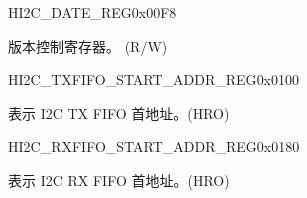     \begin{register}{H}{I2C\_DATE\_REG}{0x00F8}\label{regdesc:I2CDATEREG}
    \regnewline%
    \begin{regdesc}\begin{reglist}
    \label{fielddesc:I2CDATE}\item [I2C\_DATE] 版本控制寄存器。 (R/W)
    \end{reglist}\end{regdesc}
    \end{register}


    \begin{register}{H}{I2C\_TXFIFO\_START\_ADDR\_REG}{0x0100}\label{regdesc:I2CTXFIFOSTARTADDRREG}
    \regnewline%
    \begin{regdesc}\begin{reglist}
    \label{fielddesc:I2CTXFIFOSTARTADDR}\item [I2C\_TXFIFO\_START\_ADDR] 表示 I2C TX FIFO 首地址。(HRO)
    \end{reglist}\end{regdesc}
    \end{register}


    \begin{register}{H}{I2C\_RXFIFO\_START\_ADDR\_REG}{0x0180}\label{regdesc:I2CRXFIFOSTARTADDRREG}
    \regnewline%
    \begin{regdesc}\begin{reglist}
    \label{fielddesc:I2CRXFIFOSTARTADDR}\item [I2C\_RXFIFO\_START\_ADDR] 表示 I2C RX FIFO 首地址。(HRO)
    \end{reglist}\end{regdesc}
    \end{register}


